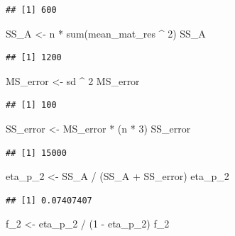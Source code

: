 \documentclass[
]{book}
\newenvironment{Shaded}{\begin{snugshade}}{\end{snugshade}}
\newcommand{\DecValTok}[1]{\textcolor[rgb]{0.00,0.00,0.81}{#1}}
\newcommand{\FunctionTok}[1]{\textcolor[rgb]{0.00,0.00,0.00}{#1}}
\newcommand{\NormalTok}[1]{#1}
\newcommand{\OtherTok}[1]{\textcolor[rgb]{0.56,0.35,0.01}{#1}}
\newcommand{\SpecialCharTok}[1]{\textcolor[rgb]{0.00,0.00,0.00}{#1}}
\begin{document}
\begin{verbatim}
## [1] 600
\end{verbatim}

\begin{Shaded}
\begin{Highlighting}[]
\NormalTok{SS\_A }\OtherTok{\textless{}{-}}\NormalTok{ n }\SpecialCharTok{*} \FunctionTok{sum}\NormalTok{(mean\_mat\_res }\SpecialCharTok{\^{}} \DecValTok{2}\NormalTok{)}
\NormalTok{SS\_A}
\end{Highlighting}
\end{Shaded}

\begin{verbatim}
## [1] 1200
\end{verbatim}

\begin{Shaded}
\begin{Highlighting}[]
\NormalTok{MS\_error }\OtherTok{\textless{}{-}}\NormalTok{ sd }\SpecialCharTok{\^{}} \DecValTok{2}
\NormalTok{MS\_error}
\end{Highlighting}
\end{Shaded}

\begin{verbatim}
## [1] 100
\end{verbatim}

\begin{Shaded}
\begin{Highlighting}[]
\NormalTok{SS\_error }\OtherTok{\textless{}{-}}\NormalTok{ MS\_error }\SpecialCharTok{*}\NormalTok{ (n }\SpecialCharTok{*} \DecValTok{3}\NormalTok{)}
\NormalTok{SS\_error}
\end{Highlighting}
\end{Shaded}

\begin{verbatim}
## [1] 15000
\end{verbatim}

\begin{Shaded}
\begin{Highlighting}[]
\NormalTok{eta\_p\_2 }\OtherTok{\textless{}{-}}\NormalTok{ SS\_A }\SpecialCharTok{/}\NormalTok{ (SS\_A }\SpecialCharTok{+}\NormalTok{ SS\_error)}
\NormalTok{eta\_p\_2}
\end{Highlighting}
\end{Shaded}

\begin{verbatim}
## [1] 0.07407407
\end{verbatim}

\begin{Shaded}
\begin{Highlighting}[]
\NormalTok{f\_2 }\OtherTok{\textless{}{-}}\NormalTok{ eta\_p\_2 }\SpecialCharTok{/}\NormalTok{ (}\DecValTok{1} \SpecialCharTok{{-}}\NormalTok{ eta\_p\_2)}
\NormalTok{f\_2}
\end{Highlighting}
\end{Shaded}
\end{document}
